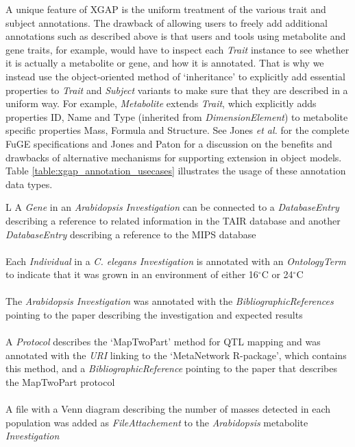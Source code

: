 A unique feature of XGAP is the uniform treatment of the various trait and subject annotations.
The drawback of allowing users to freely add additional annotations such as described above is that users and tools using metabolite and gene traits, for example, would have to inspect each \textsl{Trait} instance to see whether it is actually a metabolite or gene, and how it is annotated.
That is why we instead use the object-oriented method of ‘inheritance’ to explicitly add essential properties to \textsl{Trait} and \textsl{Subject} variants to make sure that they are described in a uniform way.
For example, \textsl{Metabolite} extends \textsl{Trait}, which explicitly adds properties ID, Name and Type (inherited from \textsl{DimensionElement}) to metabolite specific properties Mass, Formula and Structure.
See Jones \textsl{et al.}\cite{Jones_2007} for the complete FuGE specifications and Jones and Paton\cite{Jones_2005} for a discussion on the benefits and drawbacks of alternative mechanisms for supporting extension in object models.
Table \ref{table:xgap_annotation_usecases} illustrates the usage of these annotation data types.

\begin{table}
\begin{tabulary}{\linewidth}{L}
  \hline
  A \textsl{Gene} in an \textsl{Arabidopsis Investigation} can be connected to a \textsl{DatabaseEntry} describing a reference to related information in the TAIR database\cite{xgap_tair} and another \textsl{DatabaseEntry} describing a reference to the MIPS database\cite{Pagel_2004}\\
  ~\\
  Each \textsl{Individual} in a \textsl{C. elegans Investigation} is annotated with an \textsl{OntologyTerm} to indicate that it was grown in an environment of either 16$^{\circ}$C or 24$^{\circ}$C\\
  ~\\
  The \textsl{Arabidopsis Investigation} was annotated with the \textsl{BibliographicReferences} pointing to the paper describing the investigation and expected results\\
  ~\\
  A \textsl{Protocol} describes the ‘MapTwoPart’ method for QTL mapping and was annotated with the \textsl{URI} linking to the ‘MetaNetwork R-package’, which contains this method, and a \textsl{BibliographicReference} pointing to the paper\cite{Fu_2007, O_Connor_2008} that describes the MapTwoPart protocol\\
  ~\\
  A file with a Venn diagram describing the number of masses detected in each population was added as \textsl{FileAttachement} to the \textsl{Arabidopsis} metabolite \textsl{Investigation}\\
  \hline
\end{tabulary}
\caption[Use cases of annotation data types]{Use cases of annotation data types.}
\label{table:xgap_annotation_usecases}
\end{table}

